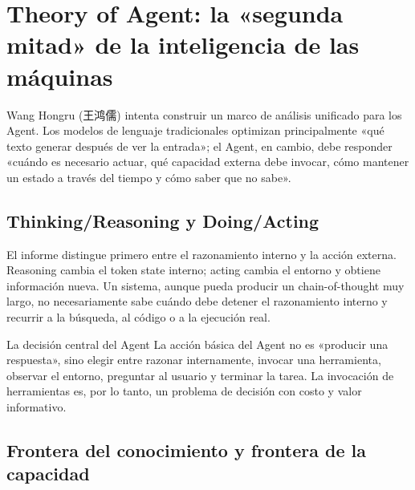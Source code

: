\section{Theory of Agent: la «segunda mitad» de la inteligencia de las máquinas}

Wang Hongru (王鸿儒) intenta construir un marco de análisis unificado para los Agent. Los modelos de lenguaje tradicionales optimizan principalmente «qué texto generar después de ver la entrada»; el Agent, en cambio, debe responder «cuándo es necesario actuar, qué capacidad externa debe invocar, cómo mantener un estado a través del tiempo y cómo saber que no sabe».


\subsection{Thinking/Reasoning y Doing/Acting}

El informe distingue primero entre el razonamiento interno y la acción externa. Reasoning cambia el token state interno; acting cambia el entorno y obtiene información nueva. Un sistema, aunque pueda producir un chain-of-thought muy largo, no necesariamente sabe cuándo debe detener el razonamiento interno y recurrir a la búsqueda, al código o a la ejecución real.



\begin{importantbox}{La decisión central del Agent}
La acción básica del Agent no es «producir una respuesta», sino elegir entre razonar internamente, invocar una herramienta, observar el entorno, preguntar al usuario y terminar la tarea. La invocación de herramientas es, por lo tanto, un problema de decisión con costo y valor informativo.
\end{importantbox}

\subsection{Frontera del conocimiento y frontera de la capacidad}

